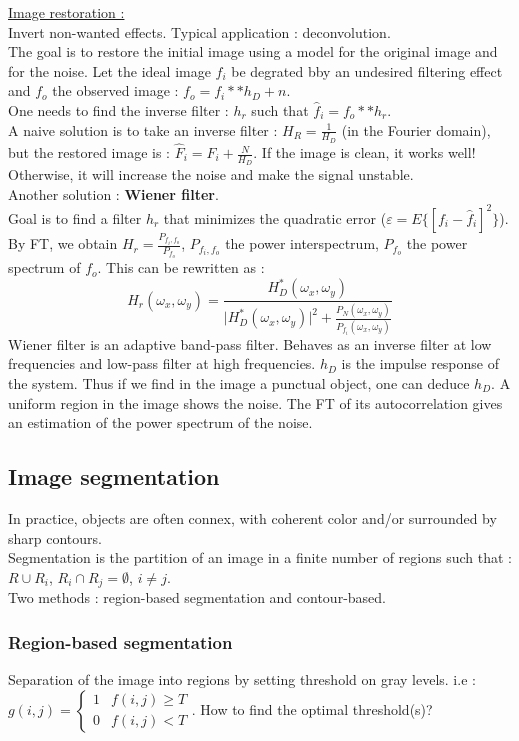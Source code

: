 \documentclass[../main.tex]{subfiles}
\begin{document}
\quad \underline{Image restoration :}\\
Invert non-wanted effects. Typical application : deconvolution.\\
The goal is to restore the initial image using a model for the original image and for the noise. Let the ideal image $f_i$ be degrated bby an undesired filtering effect and $f_o$ the observed image : $f_o = f_i ** h_D + n$.\\
One needs to find the inverse filter : $h_r$ such that $\hat{f}_i = f_o ** h_r$.\\
A naive solution is to take an inverse filter : $H_R = \frac{1}{H_D}$ (in the Fourier domain), but the restored image is : $\hat{F}_i = F_i + \frac{N}{H_D}$. If the image is clean, it works well! Otherwise, it will increase the noise and make the signal unstable.\\
Another solution : \textbf{Wiener filter}.\\
Goal is to find a filter $h_r$ that minimizes the quadratic error ($\varepsilon = E\{[f_i-\hat{f}_i]^2  \}$). By FT, we obtain $H_r = \frac{P_{f_i,f_o}}{P_{f_o}}$, $P_{f_i,f_o}$ the power interspectrum, $P_{f_o}$ the power spectrum of $f_o$. This can be rewritten as : \begin{equation}
    H_r(\omega_x, \omega_y) = \frac{H_D^*(\omega_x, \omega_y)}{\lvert H_D^*(\omega_x, \omega_y)\rvert^2 + \frac{P_N(\omega_x, \omega_y)}{P_{f_i}(\omega_x, \omega_y)}}
\end{equation}
Wiener filter is an adaptive band-pass filter. Behaves as an inverse filter at low frequencies and low-pass filter at high frequencies.
$h_D$ is the impulse response of the system. Thus if we find in the image a punctual object, one can deduce $h_D$. A uniform region in the image shows the noise. The FT of its autocorrelation gives an estimation of the power spectrum of the noise. 

\subsection{Image segmentation}
In practice, objects are often connex, with coherent color and/or surrounded by sharp contours.\\
Segmentation is the partition of an image in a finite number of regions such that : $R\cup R_i$, $R_i \cap R_j = \emptyset$, $i\neq j$.\\
Two methods : region-based segmentation and contour-based.\\

\subsubsection{Region-based segmentation}
Separation of the image into regions by setting threshold on gray levels. i.e : $g(i,j) = \begin{cases}
    1 & f(i,j)\geq T\\ 0 & f(i,j)<T
\end{cases}$. How to find the optimal threshold(s)?\\
\end{document}
